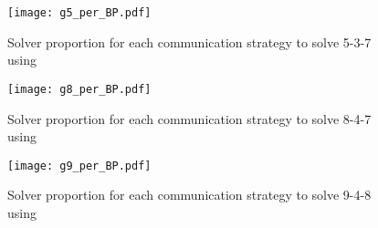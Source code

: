 



\begin{figure}[!h]
\centering
\texttt{[image: g5\_per\_BP.pdf]}
\caption{Solver proportion for each communication strategy to solve \SGP{} 5-3-7 using \posl}\label{barplot:5}
\end{figure}

\begin{figure}[!h]
\centering
\texttt{[image: g8\_per\_BP.pdf]}
\caption{Solver proportion for each communication strategy to solve \SGP{} 8-4-7 using \posl}\label{barplot:8}
\end{figure}

\begin{figure}[!h]
\centering
\texttt{[image: g9\_per\_BP.pdf]}
\caption{Solver proportion for each communication strategy to solve \SGP{} 9-4-8 using \posl}\label{barplot:9}
\end{figure}